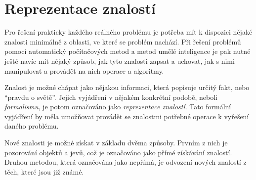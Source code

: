 \clearpage
\section{Reprezentace znalostí}
Pro řešení prakticky každého reálného problému je potřeba mít k dispozici nějaké znalosti minimálně z oblasti, ve které se problém nachází.
Při řešení problémů pomocí automatický počítačových metod a metod umělé inteligence je pak nutné ještě navíc
mít nějaký způsob, jak tyto znalosti zapsat a uchovat, jak s nimi manipulovat a provádět na nich operace a algoritmy.

Znalost je možné chápat jako nějakou informaci, která popisuje určitý fakt, nebo \enquote{pravdu o světě}.
Jejich vyjádření v nějakém konkrétní podobě, neboli \emph{formalismu}, je potom označováno jako \emph{reprezentace znalostí}.
Tato formální vyjádření by měla umožňovat provádět se znalostmi potřebné operace k vyřešení daného problému.~\cite{prepreze_znal}

Nové znalosti je možné získat v základu dvěma způsoby.
Prvním z nich je pozorování objektů a jevů, což je označováno jako přímé získávání znalostí.
Druhou metodou, která označována jako nepřímá, je odvození nových znalostí z těch, které jsou již známé.~\cite{prepreze_znal}

